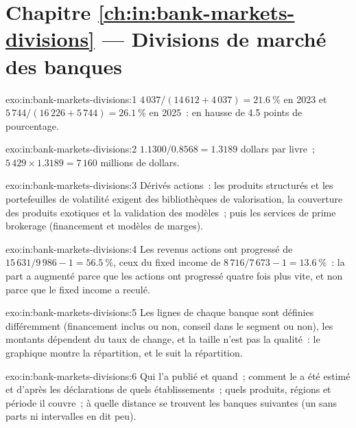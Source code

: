 \section*{Chapitre \ref{ch:in:bank-markets-divisions} --- Divisions de marché des banques}

\begin{solution}{exo:in:bank-markets-divisions:1}
$4\,037/(14\,612+4\,037)=21.6~\%$ en 2023 et $5\,744/(16\,226+5\,744)=26.1~\%$ en 2025~: en hausse de 4.5 points de pourcentage.
\end{solution}

\begin{solution}{exo:in:bank-markets-divisions:2}
$1.1300/0.8568=1.3189$ dollars par livre~; $5\,429\times1.3189=7\,160$ millions de dollars.
\end{solution}

\begin{solution}{exo:in:bank-markets-divisions:3}
Dérivés actions~: les produits structurés et les portefeuilles de volatilité exigent des bibliothèques de valorisation, la couverture des produits exotiques et la validation des modèles~;
puis les services de prime brokerage (financement et modèles de marges).
\end{solution}

\begin{solution}{exo:in:bank-markets-divisions:4}
Les revenus actions ont progressé de $15\,631/9\,986-1=56.5~\%$, ceux du fixed income de $8\,716/7\,673-1=13.6~\%$~: la part a augmenté parce que les actions
ont progressé quatre fois plus vite, et non parce que le fixed income a reculé.
\end{solution}

\begin{solution}{exo:in:bank-markets-divisions:5}
Les lignes de chaque banque sont définies différemment (financement inclus ou non, conseil dans le segment ou non), les montants dépendent du
taux de change, et la taille n'est pas la qualité~: le graphique montre la répartition, et le  suit la répartition.
\end{solution}

\begin{solution}{exo:in:bank-markets-divisions:6}
Qui l'a publié et quand~; comment le  a été estimé et d'après les déclarations de quels établissements~; quels produits, régions et
période il couvre~; à quelle distance se trouvent les banques suivantes (un  sans parts ni intervalles en dit peu).
\end{solution}

